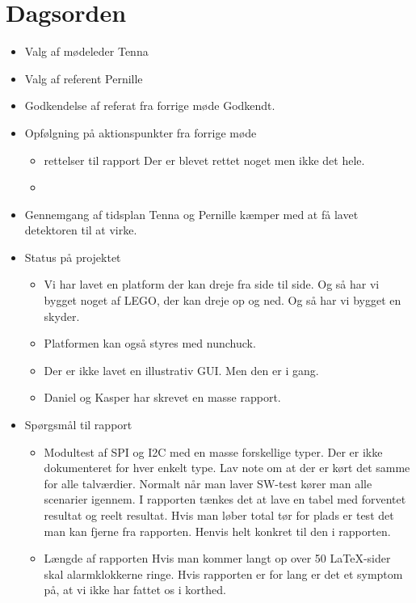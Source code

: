 \documentclass{article}
\begin{document}
	\section{Dagsorden}
	\begin{itemize}
		\item Valg af mødeleder
		\subitem Tenna
		\item Valg af referent
		\subitem Pernille
		\item Godkendelse af referat fra forrige møde 
		\subitem Godkendt. 
		\item Opfølgning på aktionspunkter fra forrige møde
		\begin{itemize}
			\item rettelser til rapport
			\subitem Der er blevet rettet noget men ikke det hele. 
			
			\item 
		\end{itemize}
		\item Gennemgang af tidsplan
		\subitem Tenna og Pernille kæmper med at få lavet detektoren til at virke. 
		\item Status på projektet
		\begin{itemize}
			\item Vi har lavet en platform der kan dreje fra side til side. Og så har vi bygget noget af LEGO, der kan dreje op og ned. Og så har vi bygget en skyder. 
			\item Platformen kan også styres med nunchuck. 
			\item Der er ikke lavet en illustrativ GUI. Men den er i gang. 
			\item Daniel og Kasper har skrevet en masse rapport. 
		\end{itemize}
		\item Spørgsmål til rapport
		\begin{itemize}
			\item Modultest af SPI og I2C med en masse forskellige typer. Der er ikke dokumenteret for hver enkelt type. Lav note om at der er kørt det samme for alle talværdier. 
			\subitem Normalt når man laver SW-test kører man alle scenarier igennem. 
			\subitem I rapporten tænkes det at lave en tabel med forventet resultat og reelt resultat. 
			\subitem Hvis man løber total tør for plads er test det man kan fjerne fra rapporten. Henvis helt konkret til den i rapporten. 
			\item Længde af rapporten
			\subitem Hvis man kommer langt op over 50 LaTeX-sider skal alarmklokkerne ringe. 
			\subitem Hvis rapporten er for lang er det et symptom på, at vi ikke har fattet os i korthed. 

\end{itemize}
\end{itemize}
\end{document}
